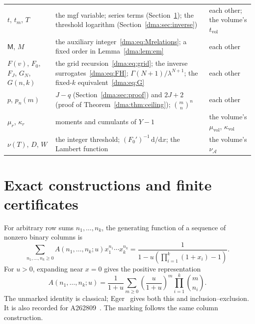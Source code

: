 \documentclass[11pt,letterpaper]{article}
\theoremstyle{remark}\newtheorem{remark}[theorem]{Remark}
\begin{document}
\begin{minipage}{\textwidth}
\begin{tabular}{@{}>{\raggedright\arraybackslash}p{0.95in}>{\raggedright\arraybackslash}p{3.45in}>{\raggedright\arraybackslash}p{1.75in}@{}}
$t$, $t_m$, $T$ & the mgf variable; series terms (Section~\ref{dma:sec:exact}); the threshold logarithm (Section~\ref{dma:sec:inverse}) & each other; the volume's $t_{\mathrm{vol}}$\\
$\mathsf M$, $M$ & the auxiliary integer~\eqref{dma:eq:Mrelations}; a fixed order in Lemma~\ref{dma:lem:em} & each other\\
$F(v)$, $F_0$, $F_J$, $G_N$, $G(n,k)$ & the grid recursion~\eqref{dma:eq:grid}; the inverse surrogates~\eqref{dma:eq:FH}; $\Gamma(N+1)/\lambda^{N+1}$; the fixed-$k$ equivalent~\eqref{dma:eq:G} & each other\\
$p$, $p_n(m)$ & $J-q$ (Section~\ref{dma:sec:proof}) and $2J+2$ (proof of Theorem~\ref{dma:thm:ceiling}); $\binom mn^n$ & each other\\
$\mu_r$, $\kappa_r$ & moments and cumulants of $Y-1$ & the volume's $\mu_{\mathrm{vol}}$, $\kappa_{\mathrm{vol}}$\\
$\nu(T)$, $D$, $W$ & the integer threshold; $(F_0')^{-1}\,\mathrm d/\mathrm dx$; the Lambert function & the volume's $\nu_{\mathcal A}$\\
\bottomrule
\end{tabular}
\endgroup
\end{minipage}

\section{Exact constructions and finite certificates}\label{dma:sec:exact}
For arbitrary row sums $n_1,\ldots,n_k$, the generating function of a sequence of nonzero binary columns is
\begin{equation}\label{dma:eq:gf}
 \sum_{n_1,\ldots,n_k\geq0} A(n_1,\ldots,n_k;u)
 x_1^{n_1}\cdots x_k^{n_k}
 =\frac1{1-u(\prod_{i=1}^k(1+x_i)-1)}.
\end{equation}
For $u>0$, expanding near $x=0$ gives the positive representation
\begin{equation}\label{dma:eq:positive}
 A(n_1,\ldots,n_k;u)=\frac1{1+u}
 \sum_{m\geq0}\left(\frac u{1+u}\right)^m
 \prod_{i=1}^k\binom m{n_i}.
\end{equation}
The unmarked identity is classical; Eger~\cite[Section 5.5]{eger} gives both this and inclusion--exclusion. It is also recorded for A262809~\cite{oeisarray}. The marking follows the same column construction.
\end{document}
